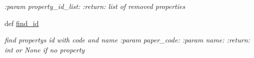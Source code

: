 \begin{DoxyCompactItemize}
\begin{DoxyCompactList}\small\item\em \+:param property\+\_\+id\+\_\+list\+: \+:return\+: list of removed properties \end{DoxyCompactList}\item 
def \hyperlink{classplume-creator_1_1src_1_1plume_1_1data_1_1property_1_1property__list_1_1_property_list_aef2384c57d59b160877f303baab0a1af}{find\+\_\+id}\hypertarget{classplume-creator_1_1src_1_1plume_1_1data_1_1property_1_1property__list_1_1_property_list_aef2384c57d59b160877f303baab0a1af}{}\label{classplume-creator_1_1src_1_1plume_1_1data_1_1property_1_1property__list_1_1_property_list_aef2384c57d59b160877f303baab0a1af}

\begin{DoxyCompactList}\small\item\em find property\textquotesingle{}s id with code and name \+:param paper\+\_\+code\+: \+:param name\+: \+:return\+: int or None if no property \end{DoxyCompactList}\end{DoxyCompactItemize}
